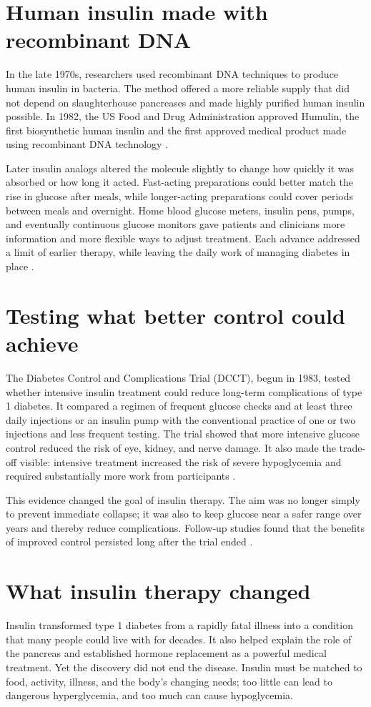 \documentclass[12pt,oneside]{book}
\begin{document}
\section{Human insulin made with recombinant DNA}
In the late 1970s, researchers used recombinant DNA techniques to produce human
insulin in bacteria. The method offered a more reliable supply that did not
depend on slaughterhouse pancreases and made highly purified human insulin
possible. In 1982, the US Food and Drug Administration approved Humulin, the
first biosynthetic human insulin and the first approved medical product made
using recombinant DNA technology \cite{fdaInsulinHistory}.

Later insulin analogs altered the molecule slightly to change how quickly it
was absorbed or how long it acted. Fast-acting preparations could better match
the rise in glucose after meals, while longer-acting preparations could cover
periods between meals and overnight. Home blood glucose meters, insulin pens,
pumps, and eventually continuous glucose monitors gave patients and clinicians
more information and more flexible ways to adjust treatment. Each advance
addressed a limit of earlier therapy, while leaving the daily work of managing
diabetes in place \cite{niddkinsulin,fdaInsulinHistory}.

\section{Testing what better control could achieve}
The Diabetes Control and Complications Trial (DCCT), begun in 1983, tested
whether intensive insulin treatment could reduce long-term complications of
type 1 diabetes. It compared a regimen of frequent glucose checks and at least
three daily injections or an insulin pump with the conventional practice of
one or two injections and less frequent testing. The trial showed that more
intensive glucose control reduced the risk of eye, kidney, and nerve damage.
It also made the trade-off visible: intensive treatment increased the risk of
severe hypoglycemia and required substantially more work from participants
\cite{niddkdcct}.

This evidence changed the goal of insulin therapy. The aim was no longer simply
to prevent immediate collapse; it was also to keep glucose near a safer range
over years and thereby reduce complications. Follow-up studies found that the
benefits of improved control persisted long after the trial ended
\cite{niddkdcct}.

\section{What insulin therapy changed}
Insulin transformed type 1 diabetes from a rapidly fatal illness into a
condition that many people could live with for decades. It also helped explain
the role of the pancreas and established hormone replacement as a powerful
medical treatment. Yet the discovery did not end the disease. Insulin must be
matched to food, activity, illness, and the body's changing needs; too little
can lead to dangerous hyperglycemia, and too much can cause hypoglycemia.
\end{document}
